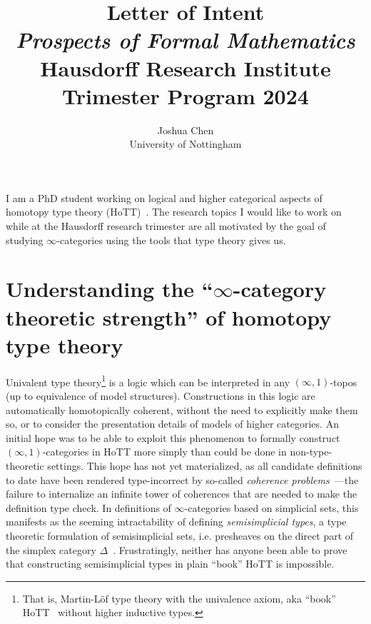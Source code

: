 \documentclass[a4paper]{article}
\title{
    \Large Letter of Intent \\
    {\normalsize \emph{Prospects of Formal Mathematics}} \\
    {\normalsize Hausdorff Research Institute Trimester Program 2024}
}
\author{
    Joshua Chen \\
    {\normalsize University of Nottingham}
}
\begin{document}
\maketitle

I am a PhD student working on logical and higher categorical aspects of homotopy type theory (HoTT)~\cite{hott-book}.
The research topics I would like to work on while at the Hausdorff research trimester are all motivated by the goal of studying $\infty$-categories using the tools that type theory gives us.

\section*{Understanding the ``$\infty$-category theoretic strength'' of homotopy type theory}

Univalent type theory\footnote{That is, Martin-L\"{o}f type theory with the univalence axiom, aka ``book'' HoTT~\cite{hott-book} without higher inductive types.} is a logic which can be interpreted in any $(\infty, 1)$-topos~\cite{shulman:19:strict-univalent-universes} (up to equivalence of model structures).
Constructions in this logic are automatically homotopically coherent, without the need to explicitly make them so, or to consider the presentation details of models of higher categories.
An initial hope was to be able to exploit this phenomenon to formally construct $(\infty, 1)$-categories in HoTT more simply than could be done in non-type-theoretic settings.
This hope has not yet materialized, as all candidate definitions to date have been rendered type-incorrect by so-called \emph{coherence problems}~\cite{cite Ulrik's talk}---the failure to internalize an infinite tower of coherences that are needed to make the definition type check.
In definitions of $\infty$-categories based on simplicial sets, this manifests as the seeming intractability of defining \emph{semisimplicial types}, a type theoretic formulation of semisimplicial sets, i.e. presheaves on the direct part of the simplex category $\Delta$~\cite{cite}.
Frustratingly, neither has anyone been able to prove that constructing semisimplicial types in plain ``book'' HoTT is impossible.
\end{document}
